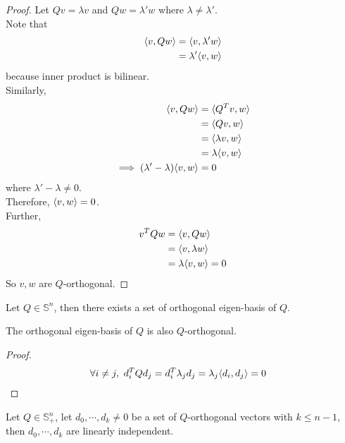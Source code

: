 \documentclass{article}
\begin{document}
	\begin{proof}
		Let $Q v = \lambda v$ and $Q w = \lambda' w$ where $\lambda \neq \lambda'$. \\
		Note that 
		\begin{align}
			\langle {v}, {Qw} \rangle &= \langle {v}, {\lambda' w} \rangle \\
			&= \lambda' \langle {v}, {w} \rangle
		\end{align}
		because inner product is bilinear. \\
		Similarly,
		\begin{align}
			\langle {v}, {Qw} \rangle &= \langle {Q^T v}, {w} \rangle \\
			&= \langle {Q v}, {w} \rangle \\
			&= \langle {\lambda v}, {w} \rangle \\
			&= \lambda \langle {v}, {w} \rangle\\
			\implies (\lambda'  - \lambda) \langle {v}, {w} \rangle &= 0
		\end{align}
		where $\lambda'  - \lambda \neq 0$. \\
		Therefore, $\langle {v}, {w} \rangle = 0$. \\
		Further, 
		\begin{align}
			v^T Q w &= \langle {v}, {Qw} \rangle \\
			&= \langle {v}, {\lambda w} \rangle \\
			&= \lambda \langle {v}, {w} \rangle = 0
		\end{align}
		So $v, w$ are $Q$-orthogonal.
	\end{proof}
	
	\begin{proposition}
		Let $Q \in \mathbb{S}^n$, then there exists a set of orthogonal eigen-basis of $Q$.
	\end{proposition}
	
	\begin{corollary}
		The orthogonal eigen-basis of $Q$ is also $Q$-orthogonal.
	\end{corollary}
	
	\begin{proof}
		\begin{align}
			\forall i \neq j,\ d_i^T Q d_j &= d_i^T \lambda_j d_j = \lambda_j \langle {d_i}, {d_j} \rangle = 0
		\end{align}
	\end{proof}
	
	\begin{proposition}
		Let $Q \in \mathbb{S}_+^n$, let $d_0, \cdots, d_k \neq 0$ be a set of $Q$-orthogonal vectors with $k \leq n - 1$, then $d_0, \cdots, d_k$ are linearly independent.
	\end{proposition}
	
\end{document}
